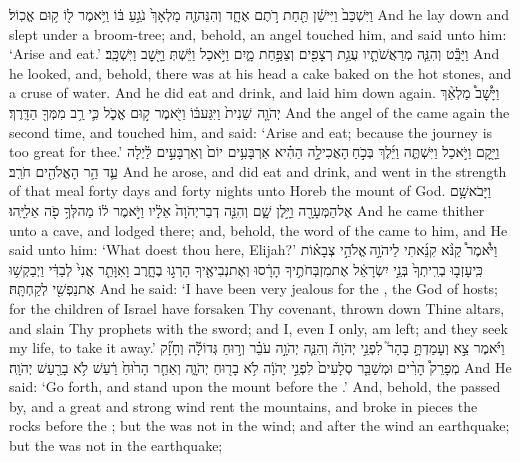 {וַיִּשְׁכַּב֙ וַיִּישַׁ֔ן תַּ֖חַת רֹ֣תֶם אֶחָ֑ד וְהִנֵּה\maqqaf זֶ֤ה מַלְאָךְ֙ נֹגֵ֣עַ בּ֔וֹ וַיֹּ֥אמֶר ל֖וֹ ק֥וּם אֱכֽוֹל׃}
{And he lay down and slept under a broom-tree; and, behold, an angel touched him, and said unto him: ‘Arise and eat.’}
{וַיַּבֵּ֕ט וְהִנֵּ֧ה מְרַאֲשֹׁתָ֛יו עֻגַ֥ת רְצָפִ֖ים וְצַפַּ֣חַת מָ֑יִם וַיֹּ֣אכַל וַיֵּ֔שְׁתְּ וַיָּ֖שׇׁב וַיִּשְׁכָּֽב׃}
{And he looked, and, behold, there was at his head a cake baked on the hot stones, and a cruse of water. And he did eat and drink, and laid him down again.}
{וַיָּ֩שׇׁב֩ מַלְאַ֨ךְ יְהֹוָ֤ה \pasek  שֵׁנִית֙ וַיִּגַּע\maqqaf בּ֔וֹ וַיֹּ֖אמֶר ק֣וּם אֱכֹ֑ל כִּ֛י רַ֥ב מִמְּךָ֖ הַדָּֽרֶךְ׃}
{And the angel of the \lord\space came again the second time, and touched him, and said: ‘Arise and eat; because the journey is too great for thee.’}
{וַיָּ֖קׇם וַיֹּ֣אכַל וַיִּשְׁתֶּ֑ה וַיֵּ֜לֶךְ בְּכֹ֣חַ \legarmeh  הָאֲכִילָ֣ה הַהִ֗יא אַרְבָּעִ֥ים יוֹם֙ וְאַרְבָּעִ֣ים לַ֔יְלָה עַ֛ד הַ֥ר הָאֱלֹהִ֖ים חֹרֵֽב׃}
{And he arose, and did eat and drink, and went in the strength of that meal forty days and forty nights unto Horeb the mount of God.}
{וַיָּבֹא\maqqaf שָׁ֥ם אֶל\maqqaf הַמְּעָרָ֖ה וַיָּ֣לֶן שָׁ֑ם וְהִנֵּ֤ה דְבַר\maqqaf יְהֹוָה֙ אֵלָ֔יו וַיֹּ֣אמֶר ל֔וֹ מַה\maqqaf לְּךָ֥ פֹ֖ה אֵלִיָּֽהוּ׃}
{And he came thither unto a cave, and lodged there; and, behold, the word of the \lord\space came to him, and He said unto him: ‘What doest thou here, Elijah?’}
{וַיֹּ֩אמֶר֩ קַנֹּ֨א קִנֵּ֜אתִי לַיהֹוָ֣ה \legarmeh  אֱלֹהֵ֣י צְבָא֗וֹת כִּֽי\maqqaf עָזְב֤וּ בְרִֽיתְךָ֙ בְּנֵ֣י יִשְׂרָאֵ֔ל אֶת\maqqaf מִזְבְּחֹתֶ֣יךָ הָרָ֔סוּ וְאֶת\maqqaf נְבִיאֶ֖יךָ הָרְג֣וּ בֶחָ֑רֶב וָאִוָּתֵ֤ר אֲנִי֙ לְבַדִּ֔י וַיְבַקְשׁ֥וּ אֶת\maqqaf נַפְשִׁ֖י לְקַחְתָּֽהּ׃}
{And he said: ‘I have been very jealous for the \lord, the God of hosts; for the children of Israel have forsaken Thy covenant, thrown down Thine altars, and slain Thy prophets with the sword; and I, even I only, am left; and they seek my life, to take it away.’}
{וַיֹּ֗אמֶר צֵ֣א וְעָמַדְתָּ֣ בָהָר֮ לִפְנֵ֣י יְהֹוָה֒ וְהִנֵּ֧ה יְהֹוָ֣ה עֹבֵ֗ר וְר֣וּחַ גְּדוֹלָ֡ה וְחָזָ֞ק מְפָרֵק֩ הָרִ֨ים וּמְשַׁבֵּ֤ר סְלָעִים֙ לִפְנֵ֣י יְהֹוָ֔ה לֹ֥א בָר֖וּחַ יְהֹוָ֑ה וְאַחַ֤ר הָר֙וּחַ֙ רַ֔עַשׁ לֹ֥א בָרַ֖עַשׁ יְהֹוָֽה׃}
{And He said: ‘Go forth, and stand upon the mount before the \lord.’ And, behold, the \lord\space passed by, and a great and strong wind rent the mountains, and broke in pieces the rocks before the \lord; but the \lord\space was not in the wind; and after the wind an earthquake; but the \lord\space was not in the earthquake;}
